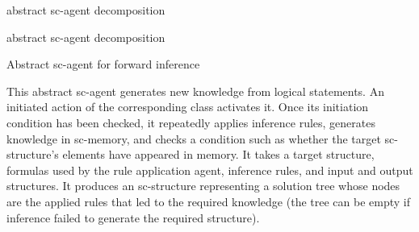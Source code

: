 \begin{frame}{}
\topline
\justifying
\vspace{10mm}

\begin{SCn}
\begin{scnrelfromset}{abstract sc-agent decomposition}
\end{scnrelfromset}
\end{SCn}
\end{frame}

\begin{frame}{}
\begin{SCn}
    \begin{scnrelfromset}{abstract sc-agent decomposition}
\end{scnrelfromset}
\end{SCn}
\end{frame}

\begin{frame}{Abstract sc-agent for forward inference}
\topline
\justifying
	\setlength{\emergencystretch}{2em}
\vspace{10mm}

  This abstract sc-agent generates new knowledge from logical statements. An initiated action of the corresponding class activates it. Once its initiation condition has been checked, it repeatedly applies inference rules, generates knowledge in sc-memory, and checks a condition such as whether the target sc-structure's elements have appeared in memory. It takes a target structure, formulas used by the rule application agent, inference rules, and input and output structures. It produces an sc-structure representing a solution tree whose nodes are the applied rules that led to the required knowledge (the tree can be empty if inference failed to generate the required structure).
\end{frame}

